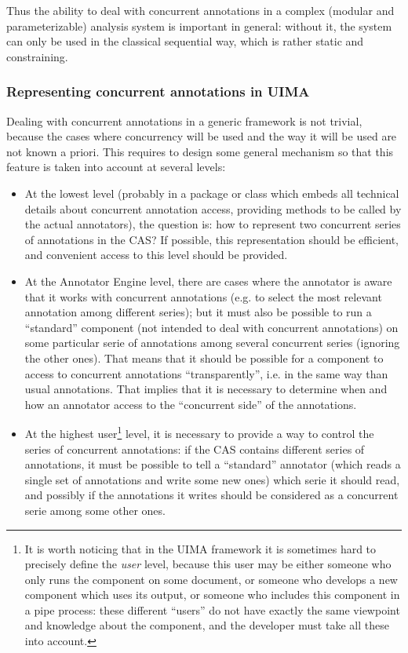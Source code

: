 \documentclass{article}
\newenvironment{xitemize}{
\begin{itemize}
  \setlength{\itemsep}{.3\baselineskip}
  \setlength{\topsep}{0pt}
  \setlength{\parskip}{0pt}
  \setlength{\parsep}{0pt}
}{\end{itemize}}
\begin{document}
Thus the ability to deal with concurrent annotations in a complex (modular and parameterizable) analysis system is important in general: without it, the system can only be used in the classical sequential way, which is rather static and constraining. 

\subsubsection{Representing concurrent annotations in UIMA}


Dealing with concurrent annotations in a generic framework is not trivial, because the cases where concurrency will be used and the way it will be used are not known a priori. This requires to design some general mechanism so that this feature is taken into account at several levels:

\begin{xitemize}
\item At the lowest level (probably in a package or class which embeds all technical details about concurrent annotation access, providing methods to be called by the actual annotators), the question is: how to represent two concurrent series of annotations in the CAS? If possible, this representation should be efficient, and convenient access to this level should be provided.

\item At the Annotator Engine level, there are cases where the annotator is aware that it works with concurrent annotations (e.g. to select the most relevant annotation among different series); but it must also be possible to run a ``standard'' component (not intended to deal with concurrent annotations) on some particular serie of annotations among several concurrent series (ignoring the other ones).  That means that it should be possible for a component to access to concurrent annotations ``transparently'', i.e. in the same way than usual annotations. That implies that it is necessary to determine when and how an annotator access to the ``concurrent side'' of the annotations.

\item At the highest user\footnote{It is worth noticing that in the UIMA framework it is sometimes hard to precisely define the {\em user} level, because this user may be either someone who only runs the component on some document, or someone who develops a new component which uses its output, or someone who includes this component in a pipe process: these different ``users'' do not have exactly the same viewpoint and knowledge about the component, and the developer must take all these into account.} level, it is necessary to provide a way to control the series of concurrent annotations: if the CAS contains different series of annotations,  it must be possible to tell a ``standard'' annotator (which reads a single set of annotations and write some new ones) which serie it should read, and possibly if the annotations it writes should be considered as a concurrent serie among some other ones.
\end{xitemize}
\end{document}
